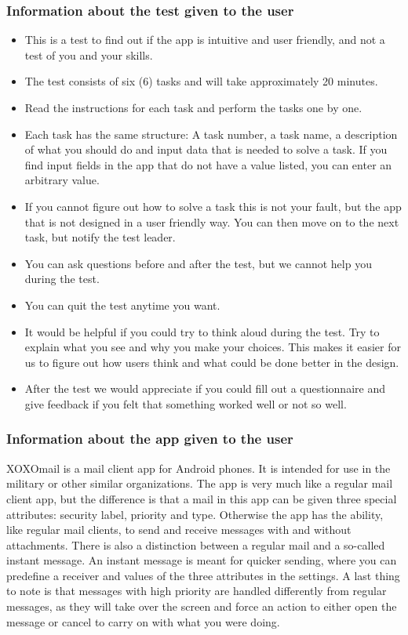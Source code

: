 \documentclass[a4paper,12pt]{article}
\begin{document}
		\subsubsection{Information about the test given to the user}
			\begin{itemize}
				\item{}This is a test to find out if the app is intuitive and user friendly, and not a test of you and your skills.
				\item{}The test consists of six (6) tasks and will take approximately 20 minutes.
				\item{}Read the instructions for each task and perform the tasks one by one.
				\item{}Each task has the same structure: A task number, a task name, a description of what you should do and input data that is needed to solve a task. If you find input fields in the app that do not have a value listed, you can enter an arbitrary value.
				\item{}If you cannot figure out how to solve a task this is not your fault, but the app that is not designed in a user friendly way. You can then move on to the next task, but notify the test leader.
				\item{}You can ask questions before and after the test, but we cannot help you during the test.
				\item{}You can quit the test anytime you want.
				\item{}It would be helpful if you could try to think aloud during the test. Try to explain what you see and why you make your choices. This makes it easier for us to figure out how users think and what could be done better in the design.
				\item{}After the test we would appreciate if you could fill out a questionnaire and give feedback if you felt that something worked well or not so well.
			\end{itemize}
\subsubsection{Information about the app given to the user}
			XOXOmail is a mail client app for Android phones. It is intended for use in the military or other similar organizations. The app is very much like a regular mail client app, but the difference is that a mail in this app can be given three special  attributes: security label, priority and type. Otherwise the app has the ability, like regular mail clients, to send and receive messages with and without attachments. 
			\newline
			\newline
			There is also a distinction between a regular mail and a so-called instant message. An instant message is meant for quicker sending, where you can predefine a receiver and values of the three attributes in the settings.  A last thing to note is that messages with high priority are handled differently from regular messages, as they will take over the screen and force an action to either open the message or cancel to carry on with what you were doing.
\end{document}
